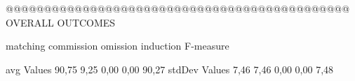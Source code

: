  @@@@@@@@@@@@@@@@@@@@@@@@@@@@@@@@@@@@@@@@@@@@@ OVERALL OUTCOMES

                matching commission   omission  induction   F-measure

avg Values       90,75       9,25       0,00       0,00       90,27        
stdDev Values    7,46        7,46       0,00       0,00        7,48        
